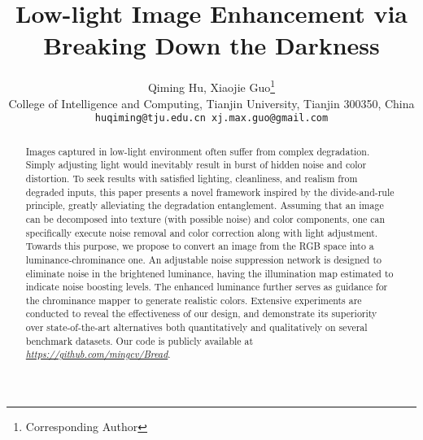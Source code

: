 \documentclass[10pt,twocolumn,letterpaper]{article}
\begin{document}
\title{Low-light Image Enhancement via Breaking Down the Darkness}

\author{Qiming Hu, Xiaojie Guo\thanks{Corresponding Author}\\
College of Intelligence and Computing, Tianjin University, Tianjin 300350, China\\
{\tt\small huqiming@tju.edu.cn   xj.max.guo@gmail.com} 
}
\maketitle
\begin{abstract}
Images captured in low-light environment often suffer from complex degradation. Simply adjusting light would inevitably result in burst of hidden noise and color distortion. To seek results with satisfied lighting, cleanliness, and realism from degraded inputs, this paper presents a novel framework inspired by the divide-and-rule principle, greatly alleviating the degradation entanglement. Assuming that an image can be decomposed into texture (with possible noise) and color components, one can specifically execute noise removal and color correction along with light adjustment. Towards this purpose, we propose to convert an image from the RGB space into a luminance-chrominance one. An adjustable noise suppression network is designed to 
eliminate noise in the brightened luminance, having the illumination map estimated to indicate noise boosting levels. The enhanced luminance further serves as guidance for the chrominance mapper to generate realistic colors. Extensive experiments are conducted to reveal the effectiveness of our design, and demonstrate its superiority over state-of-the-art alternatives both quantitatively and qualitatively on several benchmark datasets. Our code is publicly available at \emph{\href{https://github.com/mingcv/Bread}{\emph{https://github.com/mingcv/Bread}}}.


\end{abstract}
\end{document}

